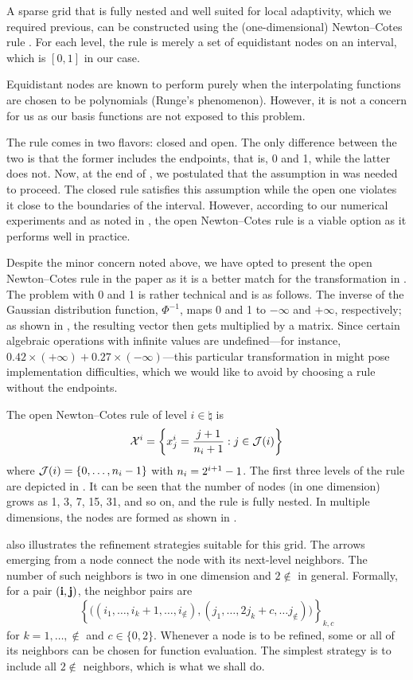 A sparse grid that is fully nested and well suited for local adaptivity, which
we required previous, can be constructed using the (one-dimensional)
Newton--Cotes rule \cite{klimke2006, ma2009}. For each level, the rule is merely
a set of equidistant nodes on an interval, which is $[0, 1]$ in our case.

\begin{remark}
Equidistant nodes are known to perform purely when the interpolating functions
are chosen to be polynomials (Runge's phenomenon). However, it is not a concern
for us as our basis functions are not exposed to this problem.
\end{remark}

The rule comes in two flavors: closed and open. The only difference between the
two is that the former includes the endpoints, that is, 0 and 1, while the
latter does not. Now, at the end of , we postulated that
the assumption in  was needed to proceed. The closed rule
satisfies this assumption while the open one violates it close to the boundaries
of the interval. However, according to our numerical experiments and as noted in
\cite{klimke2006}, the open Newton--Cotes rule is a viable option as it performs
well in practice.

Despite the minor concern noted above, we have opted to present the open
Newton--Cotes rule in the paper as it is a better match for the transformation
in . The problem with 0 and 1 is rather technical and is as
follows. The inverse of the Gaussian distribution function, $\Phi^{-1}$, maps 0
and 1 to $-\infty$ and $+\infty$, respectively; as shown in
, the resulting vector then gets multiplied by a matrix.
Since certain algebraic operations with infinite values are undefined---for
instance, $0.42 \times (+\infty) + 0.27 \times (-\infty)$---this particular
transformation in  might pose implementation difficulties,
which we would like to avoid by choosing a rule without the endpoints.


The open Newton--Cotes rule of level $i \in \natural$ is
\[
  \mathcal{X}^i = \left\{ x^i_j = \frac{j + 1}{n_i + 1}: j \in \mathcal{J}(i) \right\}
\]
where $\mathcal{J}(i) = \left\{ 0, \dots, n_i - 1 \right\}$ with $n_i = 2^{i + 1} -
1$. The first three levels of the rule are depicted in . It can be
seen that the number of nodes (in one dimension) grows as 1, 3, 7, 15, 31, and
so on, and the rule is fully nested. In multiple dimensions, the nodes are
formed as shown in .

 also illustrates the refinement strategies suitable for this grid.
The arrows emerging from a node connect the node with its next-level neighbors.
The number of such neighbors is two in one dimension and $2 \nin$ in general.
Formally, for a pair $(\mathbf{i}, \mathbf{j})$, the neighbor pairs are
\[
  \left\{ \Big( (i_1, \dots, i_k + 1, \dots, i_\nin), (j_1, \dots, 2 j_k + c, \dots j_\nin) \Big) \right\}_{k, c}
\]
for $k = 1, \dots, \nin$ and $c \in \{ 0, 2 \}$. Whenever a node is to be
refined, some or all of its neighbors can be chosen for function evaluation. The
simplest strategy is to include all $2 \nin$ neighbors, which is what we shall
do.

